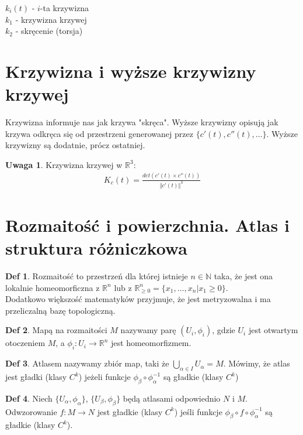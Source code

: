 \documentclass{article}
\theoremstyle{plain}
\theoremstyle{definition}
\newtheorem*{defi*}{Def}
\theoremstyle{definition}
\newtheorem*{not*}{Uwaga}
\begin{document}
\noindent $k_i(t)$ - $i$-ta krzywizna \\
$k_1$ - krzywizna krzywej \\
$k_2$ - skręcenie (torsja)

\section{Krzywizna i wyższe krzywizny krzywej}

Krzywizna informuje nas jak krzywa "skręca". Wyższe krzywizny opisują jak krzywa odkręca się od przestrzeni generowanej przez $\{ c'(t), c''(t) ,\ldots \}$. Wyższe krzywizny są dodatnie, prócz ostatniej.

\begin{not*}

Krzywizna krzywej w $\mathbb{R}^3$:
\begin{align*}
    K_c(t) = \frac{det(c'(t) \times c''(t))}{\Vert c'(t) \Vert^3}
\end{align*}

\end{not*}

\section{Rozmaitość i powierzchnia. Atlas i struktura różniczkowa}

\begin{defi*}
Rozmaitość to przestrzeń dla której istnieje $n \in \mathbb{N}$ taka, że jest ona lokalnie homeomorficzna z $\mathbb{R}^{n}$ lub z $\mathbb{R}_{\geq 0}^n = \{x_1, \ldots, x_n | x_1 \geq 0 \}$. \\
Dodatkowo większość matematyków przyjmuje, że jest metryzowalna i ma przeliczalną bazę topologiczną.
\end{defi*}

\begin{defi*}
Mapą na rozmaitości $M$ nazywamy parę $(U_i, \phi_i)$, gdzie $U_i$ jest otwartym otoczeniem $M$, a $\phi_i: U_i \to \mathbb{R}^n$ jest homeomorfizmem.
\end{defi*}

\begin{defi*}
Atlasem nazywamy zbiór map, taki że $\bigcup_{\alpha \in I} U_\alpha = M$. Mówimy, że atlas jest gładki (klasy $C^k$) jeżeli funkcje $\phi_\beta \circ \phi_\alpha^{-1}$ są gładkie (klasy $C^k$)
\end{defi*}

\begin{defi*}
Niech $\{ U_\alpha, \phi_\alpha \}$, $\{ U_\beta, \phi_\beta \}$ będą atlasami odpowiednio $N$ i $M$. Odwzorowanie $f: M \to N$ jest gładkie (klasy $C^k$) jeśli funkcje $\phi_\beta \circ f \circ \phi_\alpha^{-1} $ są gładkie (klasy $C^k$).
\end{defi*}
\end{document}
